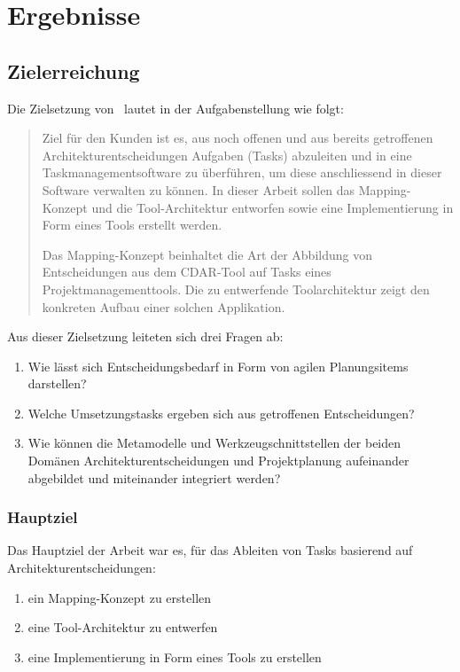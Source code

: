 \chapter{Ergebnisse}
	
	\section{Zielerreichung}
		Die Zielsetzung von \eeppi\ lautet in der Aufgabenstellung wie folgt:
		\begin{quote}
			Ziel für den Kunden ist es, aus noch offenen und aus bereits getroffenen Architekturentscheidungen  Aufgaben (Tasks) abzuleiten und in eine Taskmanagementsoftware zu überführen, um diese anschliessend in dieser Software verwalten zu können. In dieser Arbeit sollen das Mapping-Konzept und die Tool-Architektur entworfen sowie eine Implementierung in Form eines Tools erstellt werden.
			
			Das Mapping-Konzept beinhaltet die Art der Abbildung von Entscheidungen aus dem CDAR-Tool auf Tasks eines Projektmanagementtools. Die zu entwerfende Toolarchitektur zeigt den konkreten Aufbau einer solchen Applikation.
		\end{quote}
	Aus dieser Zielsetzung leiteten sich drei Fragen ab:
	\begin{enumerate}
		\item{Wie lässt sich Entscheidungsbedarf in Form von agilen Planungsitems darstellen?}
		\item{Welche Umsetzungstasks ergeben sich aus getroffenen Entscheidungen?}
		\item{Wie können die Metamodelle und Werkzeugschnittstellen der beiden Domänen Architekturentscheidungen und Projektplanung aufeinander abgebildet und miteinander integriert werden?}
	\end{enumerate}
	
	\subsection{Hauptziel}
		Das Hauptziel der Arbeit war es, für das Ableiten von Tasks basierend auf Architekturentscheidungen:
		\begin{enumerate}
			\item{ein Mapping-Konzept zu erstellen}
			\item{eine Tool-Architektur zu entwerfen}
			\item{eine Implementierung in Form eines Tools zu erstellen}
		\end{enumerate}
		
